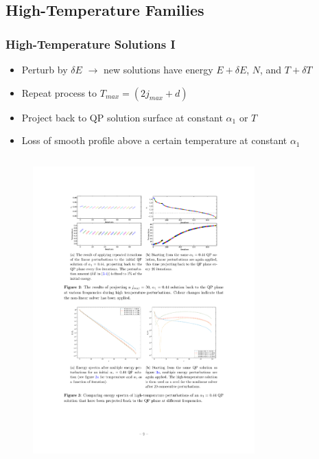 \documentclass[mathserif,10pt]{beamer}
\newcommand{\bi}{\begin{itemize}}
\newcommand{\ei}{\end{itemize}}
\newcommand{\its}{\item}
\newcommand{\jm}{j_{max}}
\begin{document}
\subsection{High-Temperature Families}
\frame
{
  \frametitle{High-Temperature Solutions I}
  \bi
  \its Perturb by $\delta E$ $\to$ new solutions have energy $E + \delta E$, $N$, and $T + \delta T$
  \its Repeat process to $T_{max} = (2\jm + d)$
  \its Project back to QP solution surface at constant $\alpha_1$ or $T$
  \its Loss of smooth profile above a certain temperature at \alert<1>{constant $\alpha_1$} 
  \ei
  
  \vspace{-0.15in}
  \begin{columns}
  \begin{figure}
  \centering
  \hspace{0.1in}
  \includegraphics[scale=0.75]{reop5}
  \end{figure}
  \begin{figure}

\end{figure}
\end{columns}}
\end{document}
